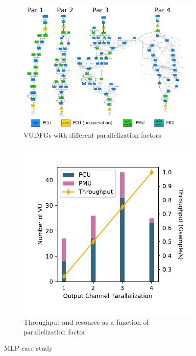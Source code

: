 \begin{figure}
\centering
\begin{subfigure}[b]{0.6\textwidth}
\includegraphics[width=1\textwidth]{figs/mlpunroll.pdf}
\caption{VUDFGs with different parallelization factors}
\end{subfigure}
\hfill
\begin{subfigure}[b]{0.39\textwidth}
\includegraphics[width=1\textwidth]{figs/mlp.pdf}
\caption{Throughput and resource as a function of parallelization factor}
\end{subfigure}
\caption[MLP case study]{
  MLP case study
}
\label{fig:mlp}
\end{figure}

